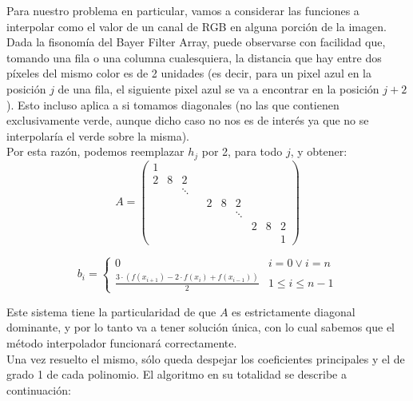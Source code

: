 \documentclass[a4paper]{article}
\begin{document}
Para nuestro problema en particular, vamos a considerar las funciones a interpolar como el valor de un canal de RGB en alguna porción de la imagen. Dada la fisonomía del Bayer Filter Array, puede observarse con facilidad que, tomando una fila o una columna cualesquiera, la distancia que hay entre dos píxeles del mismo color es de 2 unidades (es decir, para un pixel azul en la posición $j$ de una fila, el siguiente pixel azul se va a encontrar en la posición $j+2$). Esto incluso aplica a si tomamos diagonales (no las que contienen exclusivamente verde, aunque dicho caso no nos es de interés ya que no se interpolaría el verde sobre la misma). \\
Por esta razón, podemos reemplazar $h_j$ por 2, para todo $j$, y obtener: \\

\[
A = \left(
\begin{array}{cccccccccc}
1 &  &  &  &  &  &  & &  & \\
2 & 8 & 2 &   & & & & &  & \\
 &  & \ddots &  &  &  &  &  &  &  \\
 &  &  &  & 2 & 8 & 2 & &  & \\
 &  &  &  &  &  & \ddots &  &  &  \\
 &  &  &  &  & & & 2 & 8 & 2\\
 &  &  &  &  &  &  &  &  & 1
\end{array}
\right)
\]

\bigskip

\[
b_i =
\begin{cases}
0 & i = 0 \lor i = n \\
\frac{3\cdot(f(x_{i+1})-2\cdot f(x_i)+f(x_{i-1}))}{2} & 1 \leq i \leq n-1
\end{cases}
\]

\bigskip
Este sistema tiene la particularidad de que $A$ es estrictamente diagonal dominante, y por lo tanto va a tener solución única, con lo cual sabemos que el método interpolador funcionará correctamente. \\

Una vez resuelto el mismo, sólo queda despejar los coeficientes principales y el de grado 1 de cada polinomio. El algoritmo en su totalidad se describe a continuación:
\pagebreak
\end{document}
